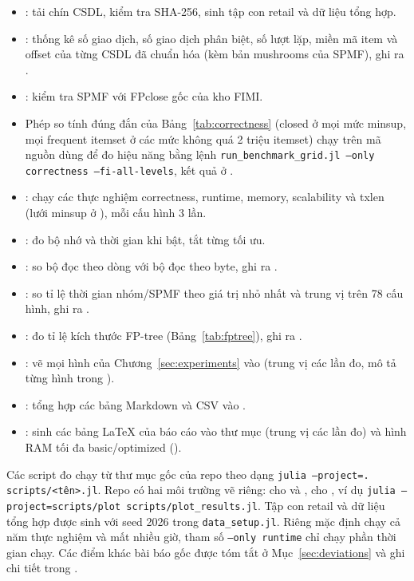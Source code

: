 \begin{itemize}
  \item {}: tải chín CSDL, kiểm tra SHA-256, sinh tập con retail và dữ liệu tổng hợp.
  \item {}: thống kê số giao dịch, số giao dịch phân biệt, số lượt lặp, miền mã item
        và offset của từng CSDL đã chuẩn hóa (kèm bản mushrooms của SPMF), ghi ra
        .
  \item {}: kiểm tra SPMF với FPclose gốc của kho FIMI.
  \item Phép so tính đúng đắn của Bảng~\ref{tab:correctness} (closed ở mọi mức minsup, mọi frequent itemset ở các mức
        không quá 2 triệu itemset) chạy trên mã nguồn dùng để đo hiệu năng bằng lệnh \texttt{run\_benchmark\_grid.jl
        --only correctness --fi-all-levels}, kết quả ở
        .
  \item {}: chạy các thực nghiệm correctness, runtime, memory, scalability và
        txlen (lưới minsup ở ), mỗi cấu hình 3 lần.
  \item {}: đo bộ nhớ và thời gian khi bật, tắt từng tối ưu.
  \item {}: so bộ đọc theo dòng với bộ đọc theo byte, ghi ra
        .
  \item {}: so tỉ lệ thời gian nhóm/SPMF theo giá trị nhỏ nhất và trung vị
        trên 78 cấu hình, ghi ra .
  \item {}: đo tỉ lệ kích thước FP-tree (Bảng~\ref{tab:fptree}), ghi ra
        .
  \item {}: vẽ mọi hình của Chương~\ref{sec:experiments} vào 
        (trung vị các lần đo, mô tả từng hình trong ).
  \item {}: tổng hợp các bảng Markdown và CSV vào .
  \item {}: sinh các bảng LaTeX của báo cáo vào thư mục  (trung vị các
        lần đo) và hình RAM tối đa basic/optimized ().
\end{itemize}
Các script đo chạy từ thư mục gốc của repo theo dạng \texttt{julia --project=. scripts/<tên>.jl}. Repo có hai môi
trường vẽ riêng:  cho  và , 
cho , ví dụ \texttt{julia --project=scripts/plot scripts/plot\_results.jl}. Tập con retail
và dữ liệu tổng hợp được sinh với seed 2026 trong \texttt{data\_setup.jl}. Riêng
 mặc định chạy cả năm thực nghiệm và mất nhiều giờ, tham số \texttt{--only runtime} chỉ
chạy phần thời gian chạy. Các điểm khác bài báo gốc được tóm tắt ở Mục~\ref{sec:deviations} và ghi chi tiết trong
.
